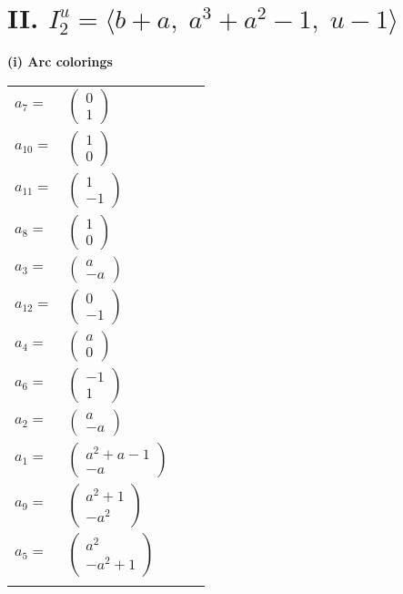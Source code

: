 \documentclass[1p]{elsarticle_modified}
\theoremstyle{definition}
\begin{document}
\centering \section*{II. $I^u_{2}= \langle b+a,\;a^3+a^2-1,\;u-1 \rangle$}
\flushleft \textbf{(i) Arc colorings}\\
\begin{tabular}{m{7pt} m{180pt} m{7pt} m{180pt} }
\flushright $a_{7}=$&$\begin{pmatrix}0\\1\end{pmatrix}$ \\
\flushright $a_{10}=$&$\begin{pmatrix}1\\0\end{pmatrix}$ \\
\flushright $a_{11}=$&$\begin{pmatrix}1\\-1\end{pmatrix}$ \\
\flushright $a_{8}=$&$\begin{pmatrix}1\\0\end{pmatrix}$ \\
\flushright $a_{3}=$&$\begin{pmatrix}a\\- a\end{pmatrix}$ \\
\flushright $a_{12}=$&$\begin{pmatrix}0\\-1\end{pmatrix}$ \\
\flushright $a_{4}=$&$\begin{pmatrix}a\\0\end{pmatrix}$ \\
\flushright $a_{6}=$&$\begin{pmatrix}-1\\1\end{pmatrix}$ \\
\flushright $a_{2}=$&$\begin{pmatrix}a\\- a\end{pmatrix}$ \\
\flushright $a_{1}=$&$\begin{pmatrix}a^2+a-1\\- a\end{pmatrix}$ \\
\flushright $a_{9}=$&$\begin{pmatrix}a^2+1\\- a^2\end{pmatrix}$ \\
\flushright $a_{5}=$&$\begin{pmatrix}a^2\\- a^2+1\end{pmatrix}$\\&\end{tabular}
\end{document}
